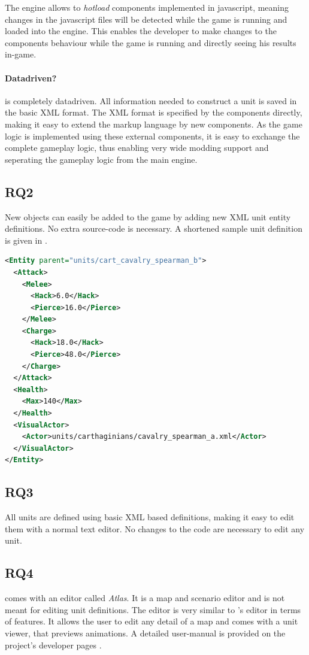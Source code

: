 The engine allows to \textit{hotload} components implemented in javascript, meaning changes in the javascript files will
be detected while the game is running and loaded into the engine. This enables the developer to make changes to the
components behaviour while the game is running and directly seeing his results in-game.

\paragraph{Datadriven?}
\AD{} is completely datadriven. All information needed to construct a unit is saved in the basic XML format.
The XML format is specified by the components directly, making it easy to extend the markup language by new components.
As the game logic is implemented using these external components, it is easy to exchange the complete gameplay logic,
thus enabling very wide modding support and seperating the gameplay logic from the main engine.

\subsection{RQ2}
New objects can easily be added to the game by adding new XML unit entity definitions. No extra source-code is
necessary. A shortened sample unit definition is given in .

\begin{lstlisting}[language=XML,caption=A basic \AD{} (shortened) unit definition in XML, label=0adxml]
<Entity parent="units/cart_cavalry_spearman_b">
  <Attack>
    <Melee>
      <Hack>6.0</Hack>
      <Pierce>16.0</Pierce>
    </Melee>
    <Charge>
      <Hack>18.0</Hack>
      <Pierce>48.0</Pierce>
    </Charge>
  </Attack>
  <Health>
    <Max>140</Max>
  </Health>
  <VisualActor>
    <Actor>units/carthaginians/cavalry_spearman_a.xml</Actor>
  </VisualActor>
</Entity>
\end{lstlisting}

\subsection{RQ3}
All units are defined using basic XML based definitions, making it easy to edit them with a normal text editor. No
changes to the code are necessary to edit any unit.

\subsection{RQ4}
\AD{} comes with an editor called \textit{Atlas}. It is a map and scenario editor and is not meant for editing unit
definitions. The editor is very similar to \GLEST{}'s editor in terms of features. It allows the user to edit any detail
of a map and comes with a unit viewer, that previews animations. A detailed user-manual is provided on the project's developer
pages \cite{0adeditor}.

